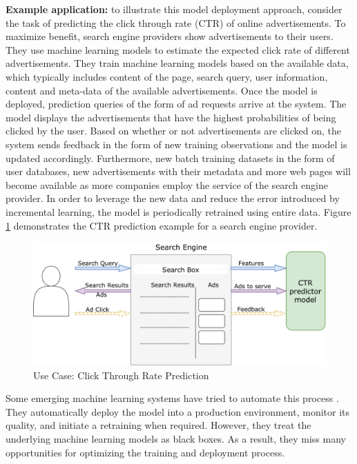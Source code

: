\documentclass{vldb}
\begin{document}
\textbf{Example application:} to illustrate this model deployment approach, consider the task of predicting the click through rate (CTR) of online advertisements.
To maximize benefit, search engine providers show advertisements to their users.
They use machine learning models to estimate the expected click rate of different advertisements.
They train machine learning models based on the available data, which typically includes content of the page, search query, user information, content and meta-data of the available advertisements. 
Once the model is deployed, prediction queries of the form of ad requests arrive at the system.
The model displays the advertisements that have the highest probabilities of being clicked by the user.
Based on whether or not advertisements are clicked on, the system sends feedback in the form of new training observations and the model is updated accordingly.
Furthermore, new batch training datasets in the form of user databases, new advertisements with their metadata and more web pages will become available as more companies employ the service of the search engine provider.
In order to leverage the new data and reduce the error introduced by incremental learning, the model is periodically retrained using entire data.
Figure \ref{fig:click-rate} demonstrates the CTR prediction example for a search engine provider.

\begin{figure}[h]
\centering
\includegraphics[width=\columnwidth]{../images/use-case-4.pdf}
\caption{Use Case: Click Through Rate Prediction}
\label{fig:click-rate}
\end{figure}

Some emerging machine learning systems have tried to automate this process \cite{crankshaw2014missing}.
They automatically deploy the model into a production environment, monitor its quality, and initiate a retraining when required.
However, they treat the underlying machine learning models as black boxes. 
As a result, they miss many opportunities for optimizing the training and deployment process.
\end{document}
